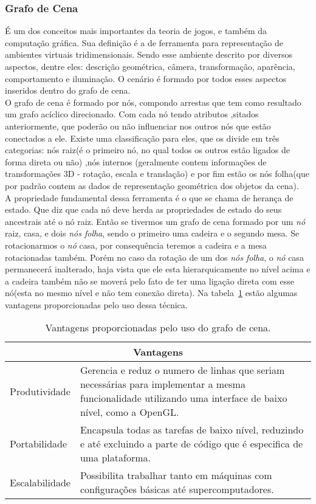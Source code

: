 \subsubsection{Grafo de Cena}
É um dos conceitos mais importantes da teoria de jogos, e também da computação gráfica. Sua definição é a de ferramenta para representação de ambientes virtuais tridimensionais. Sendo esse ambiente descrito por diversos aspectos, dentre eles: descrição geométrica, câmera, transformação, aparência, comportamento e iluminação\cite{ferreira}. O cenário é formado por todos esses aspectos inseridos dentro do grafo de cena. \\

O grafo de cena é formado por nós, compondo arrestas que tem como resultado um grafo acíclico direcionado. Com cada nó tendo atributos ,sitados anteriormente, que poderão ou não influenciar nos outros nós que estão conectados a ele. Existe uma classificação para eles, que os divide em três categorias: nós raiz(é o primeiro nó, no qual todos os outros estão ligados de forma direta ou não) ,nós internos (geralmente contem informações de transformações 3D - rotação, escala e translação) e por fim estão os nós folha(que por padrão contem as dados de representação geométrica dos objetos da cena).\\ 

A propriedade fundamental dessa ferramenta é o que se chama de herança de estado. Que diz que cada nó deve herda as propriedades de estado do seus ancestrais até o nó raiz. Então se tivermos um grafo de cena formado por um \textit{nó} raiz, casa, e dois \textit{nós folha}, sendo o primeiro uma cadeira e o segundo mesa. Se rotacionarmos o \textit{nó} casa, por consequência teremos a cadeira e a mesa rotacionadas também. Porém no caso da rotação de um dos \textit{nós folha}, o \textit{nó} casa permanecerá inalterado, haja vista que ele esta hierarquicamente no nível acima e a cadeira também não se moverá pelo fato de ter uma ligação direta com esse nó(esta no mesmo nível e não tem conexão direta). Na tabela~\ref{tb:grafo_cena} estão algumas vantagens proporcionadas pelo uso dessa técnica.\\

\begin{table}
\centering
\begin{tabular}{|p{3cm}|p{8cm}|}
	\hline
	\multicolumn{2}{|c|}{Vantagens} \\ \hline
	Produtividade &  Gerencia e reduz o numero de linhas que seriam necessárias para implementar
a mesma funcionalidade utilizando uma interface de baixo nível, como a OpenGL.\\ \hline
	Portabilidade &  Encapsula todas as tarefas de baixo nível, reduzindo e até 
excluindo a parte de código que é especifica de uma plataforma.\\ \hline
	Escalabilidade &  Possibilita trabalhar tanto em máquinas com configurações básicas até supercomputadores.\\ 
	\hline
\end{tabular}
\caption{Vantagens proporcionadas pelo uso do grafo de cena.}
\label{tb:grafo_cena}
\end{table}

